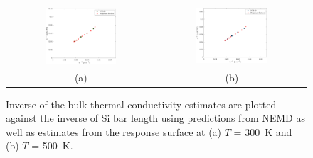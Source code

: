 \clearpage


\begin{figure}[p]
\begin{center}
\begin{tabular}{cc}
 \hspace{-10mm}
  \includegraphics[width=0.50\textwidth]{./Figures/kinv_300}
  &
  \includegraphics[width=0.50\textwidth]{./Figures/kinv_500}
  \\ (a) & (b)
  \end{tabular}
 \caption{Inverse of the bulk thermal conductivity estimates are plotted against the inverse of Si bar length
 using predictions from NEMD as well as estimates from the response surface at (a)  $T$ = 300~K and 
 (b) $T$ = 500~K.}
\label{fig:rs3}
\end{center}
\end{figure}

\clearpage

 

